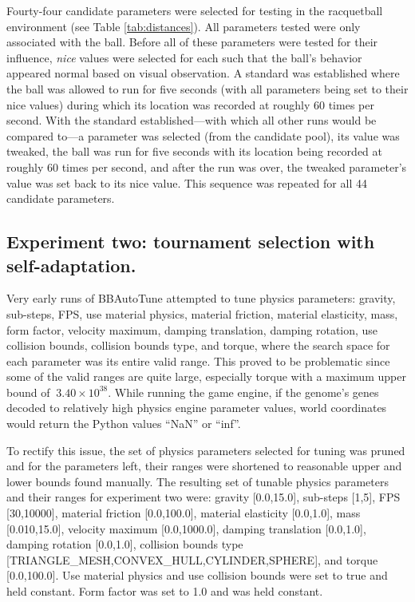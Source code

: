 Fourty-four candidate parameters were selected for testing in the racquetball environment (see Table \ref{tab:distances}). All parameters tested were only associated with the ball. Before all of these parameters were tested for their influence, \textit{nice} values were selected for each such that the ball's behavior appeared normal based on visual observation. A standard was established where the ball was allowed to run for five seconds (with all parameters being set to their nice values) during which its location was recorded at roughly 60 times per second. With the standard established---with which all other runs would be compared to---a parameter was selected (from the candidate pool), its value was tweaked, the ball was run for five seconds with its location being recorded at roughly 60 times per second, and after the run was over, the tweaked parameter's value was set back to its nice value. This sequence was repeated for all 44 candidate parameters.

\subsection[Experiment Two]{Experiment two: tournament selection with self-adaptation.}

Very early runs of BBAutoTune attempted to tune physics parameters: gravity, sub-steps, FPS, use material physics, material friction, material elasticity, mass, form factor, velocity maximum, damping translation, damping rotation, use collision bounds, collision bounds type, and torque, where the search space for each parameter was its entire valid range. This proved to be problematic since some of the valid ranges are quite large, especially torque with a maximum upper bound of $~3.40\times10^{38}$. While running the game engine, if the genome's genes decoded to relatively high physics engine parameter values, world coordinates would return the Python values ``NaN'' or ``inf''.

To rectify this issue, the set of physics parameters selected for tuning was pruned and for the parameters left, their ranges were shortened to reasonable upper and lower bounds found manually. The resulting set of tunable physics parameters and their ranges for experiment two were: gravity [0.0,15.0], sub-steps [1,5], FPS [30,10000], material friction [0.0,100.0], material elasticity [0.0,1.0], mass [0.010,15.0], velocity maximum [0.0,1000.0], damping translation [0.0,1.0], damping rotation [0.0,1.0], collision bounds type [TRIANGLE\_MESH,CONVEX\_HULL,CYLINDER,SPHERE], and torque [0.0,100.0]. Use material physics and use collision bounds were set to true and held constant. Form factor was set to 1.0 and was held constant. 

